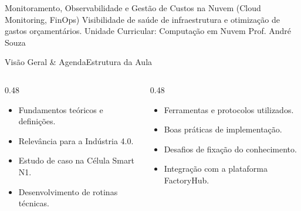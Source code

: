 
\senaicover
  {Monitoramento, Observabilidade e Gestão de Custos na Nuvem (Cloud Monitoring, FinOps)}
  {Visibilidade de saúde de infraestrutura e otimização de gastos orçamentários.}
  {Unidade Curricular: Computação em Nuvem}
  {Prof. André Souza}

\begin{senaiframe}{Visão Geral \& Agenda}{Estrutura da Aula}
  \begin{columns}[t]
    \begin{column}{0.48\textwidth}
      \begin{tcolorbox}[senaibluecard, title={1. Conceitos Chave}]
        \begin{itemize}
          \item Fundamentos teóricos e definições.
          \item Relevância para a Indústria 4.0.
        \end{itemize}
      \end{tcolorbox}
      \vspace{4pt}
      \begin{tcolorbox}[senaiambercard, title={3. Aplicação Prática}]
        \begin{itemize}
          \item Estudo de caso na Célula Smart N1.
          \item Desenvolvimento de rotinas técnicas.
        \end{itemize}
      \end{tcolorbox}
    \end{column}
    \begin{column}{0.48\textwidth}
      \begin{tcolorbox}[senairedcard, title={2. Detalhamento Técnico}]
        \begin{itemize}
          \item Ferramentas e protocolos utilizados.
          \item Boas práticas de implementação.
        \end{itemize}
      \end{tcolorbox}
      \vspace{4pt}
      \begin{tcolorbox}[senaigreencard, title={4. Exercícios \& Avaliação}]
        \begin{itemize}
          \item Desafios de fixação do conhecimento.
          \item Integração com a plataforma FactoryHub.
        \end{itemize}
      \end{tcolorbox}
    \end{column}
  \end{columns}
\end{senaiframe}

